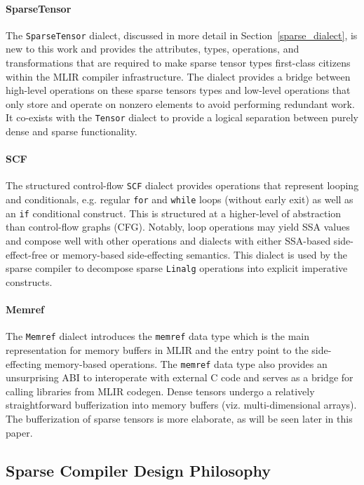 \documentclass[10pt]{article}
\begin{document}
\paragraph{SparseTensor}
The \texttt{SparseTensor} dialect, discussed in more detail in Section~\ref{sparse_dialect}, is new to this work and provides the attributes, types, operations, and transformations that are required to make sparse tensor types first-class citizens within the MLIR compiler infrastructure. The dialect provides a bridge between high-level operations on these sparse tensors types and low-level operations that only store and operate on nonzero elements to avoid performing redundant work. It co-exists with the \texttt{Tensor} dialect to provide a logical separation between purely dense and sparse functionality.

\paragraph{SCF}
The structured control-flow \texttt{SCF} dialect provides operations that represent looping and conditionals, e.g. regular \texttt{for} and \texttt{while} loops (without early exit) as well as an \texttt{if} conditional construct. This is structured at a higher-level of abstraction than control-flow graphs (CFG). Notably, loop operations may yield SSA values and compose well with other operations and dialects with either SSA-based side-effect-free or memory-based side-effecting semantics. This dialect is used by the sparse compiler to decompose sparse \texttt{Linalg} operations into explicit imperative constructs.

\paragraph{Memref}
The \texttt{Memref} dialect introduces the \texttt{memref} data type which is the main representation for memory buffers in MLIR and the entry point to the side-effecting memory-based operations. The \texttt{memref} data type also provides an unsurprising ABI to interoperate with external C code and serves as a  bridge for calling libraries from MLIR codegen. Dense tensors undergo a relatively straightforward bufferization into memory buffers (viz. multi-dimensional arrays). The bufferization of sparse tensors is more elaborate, as will be seen later in this paper. 

\subsection{Sparse Compiler Design Philosophy}
\end{document}
